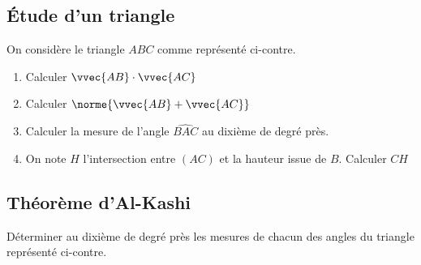 \documentclass[oneside,12pt]{book}          %
\begin{document}
\subsection{Étude d'un triangle}

\begin{minipage}{0.35\linewidth}
\end{minipage}%
\begin{minipage}{0.65\linewidth}
    On considère le triangle $ABC$ comme représenté ci-contre.
    \begin{enumerate}
        \item Calculer $\vvec{AB}\cdot\vvec{AC}$
        \item Calculer $\norme{\vvec{AB}+\vvec{AC}}$
        \item Calculer la mesure de l'angle $\widehat{BAC}$ au dixième de degré près.
        \item On note $H$ l'intersection entre $(AC)$ et la hauteur issue de $B$. Calculer $CH$
    \end{enumerate}
\end{minipage}



\subsection{Théorème d'Al-Kashi}

\begin{minipage}{0.4\linewidth}
\end{minipage}%
\begin{minipage}{0.5\linewidth}
  Déterminer au dixième de degré près les mesures de chacun des angles du triangle représenté ci-contre.
\end{minipage}
\end{document}
